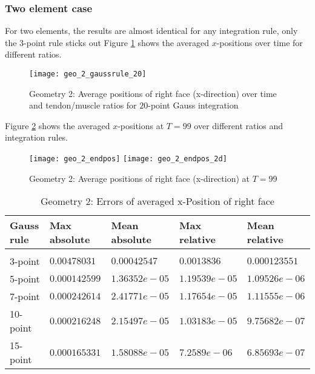 \subsubsection{Two element case}
For two elements, the results are almost identical for any integration rule, only the $3$-point rule sticks out
Figure \ref{fig:geo2_res} shows the averaged $x$-positions over time for different ratios.
\begin{figure}[!ht]
	\texttt{[image: geo\_2\_gaussrule\_20]}
	\caption{Geometry 2: Average positions of right face (x-direction) over time and tendon/muscle ratios for $20$-point Gauss integration}
	\label{fig:geo2_res}
\end{figure}
Figure \ref{fig:geo2_endpos} shows the averaged $x$-positions at $T=99$ over different ratios and integration rules. 
\begin{figure}[!ht]
	\texttt{[image: geo\_2\_endpos]}
	\texttt{[image: geo\_2\_endpos\_2d]}
	\caption{Geometry 2: Average positions of right face (x-direction) at $T=99$}
	\label{fig:geo2_endpos}
\end{figure}

\begin{table}[!htb]
	\centering
	\def\arraystretch{1.3}
	\begin{tabular}{lllll}
		Gauss rule	& Max absolute	& Mean absolute	& Max relative	& Mean relative\\
		\hline\\
		3-point		& $0.00478031$	& $0.00042547$	& $0.0013836$	& $0.000123551$\\
		5-point		& $0.000142599$	& $1.36352e-05$	& $1.19539e-05$	& $1.09526e-06$\\
		7-point		& $0.000242614$	& $2.41771e-05$	& $1.17654e-05$	& $1.11555e-06$\\
		10-point	& $0.000216248$	& $2.15497e-05$	& $1.03183e-05$	& $9.75682e-07$\\
		15-point	& $0.000165331$	& $1.58088e-05$	& $7.2589e-06$	& $6.85693e-07$\\
	\end{tabular}
	\caption{Geometry 2: Errors of averaged x-Position of right face}
\end{table}
